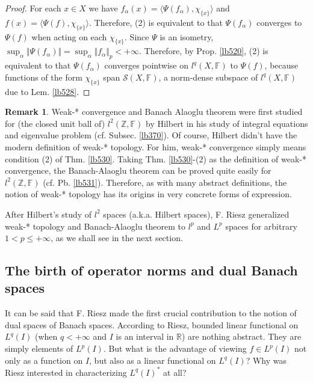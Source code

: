 \documentclass[12pt,b5paper,notitlepage]{article}
\theoremstyle{definition}
\newtheorem{rem}[df]{Remark}
\theoremstyle{plain}
\newcommand{\mc}{\mathcal}
\newcommand{\bk}[1]{\langle {#1}\rangle}
\newcommand{\Zbb}{\mathbb Z}
\newcommand{\Rbb}{\mathbb R}
\newcommand{\Fbb}{\mathbb F}
\numberwithin{equation}{section}
\begin{document}
\begin{proof}
For each $x\in X$ we have $f_\alpha(x)=\bk{\Psi(f_\alpha),\chi_{\{x\}}}$ and $f(x)=\bk{\Psi(f),\chi_{\{x\}}}$. Therefore, (2) is equivalent to that $\Psi(f_\alpha)$ converges to $\Psi(f)$ when acting on each $\chi_{\{x\}}$.  Since $\Psi$ is an isometry, $\sup_\alpha \Vert\Psi(f_\alpha)\Vert=\sup_\alpha\Vert f_\alpha\Vert_p<+\infty$. Therefore, by Prop. \ref{lb520}, (2) is equivalent to that $\Psi(f_\alpha)$ converges pointwise on $l^q(X,\Fbb)$ to $\Psi(f)$, because functions of the form $\chi_{\{x\}}$ span $\mc S(X,\Fbb)$, a norm-dense subspace of $l^q(X,\Fbb)$ due to Lem. \ref{lb528}.
\end{proof}


\begin{rem}
Weak-* convergence and Banach Alaoglu theorem were first studied for (the closed unit ball of) $l^2(\Zbb,\Fbb)$ by Hilbert in his study of integral equations and eigenvalue problem (cf. Subsec. \ref{lb370}). Of course, Hilbert didn't have the modern definition of weak-* topology. For him, weak-* convergence simply means condition (2) of Thm. \ref{lb530}. Taking Thm. \ref{lb530}-(2) as the definition of weak-* convergence, the Banach-Alaoglu theorem can be proved quite easily for $l^2(\Zbb,\Fbb)$ (cf. Pb. \ref{lb531}). Therefore, as with many abstract definitions, the notion of weak-* topology has its origins in very concrete forms of expression. 
\end{rem}

After Hilbert's study of $l^2$ spaces (a.k.a. Hilbert spaces), F. Riesz generalized weak-* topology and Banach-Alaoglu theorem to $l^p$ and $L^p$ spaces for arbitrary $1<p\leq+\infty$, as we shall see in the next section.







\subsection{The birth of operator norms and dual Banach spaces}

It can be said that F. Riesz made the first crucial contribution to the notion of dual spaces of Banach spaces. According to Riesz, bounded linear functional on $L^q(I)$ (when $q<+\infty$ and $I$ is an interval in $\Rbb$) are nothing abstract. They are simply elements of $L^p(I)$. But what is the advantage of viewing $f\in L^p(I)$ not only as a function on $I$, but also as a linear functional on $L^q(I)$? Why was Riesz interested in characterizing $L^q(I)^*$ at all?
\end{document}
